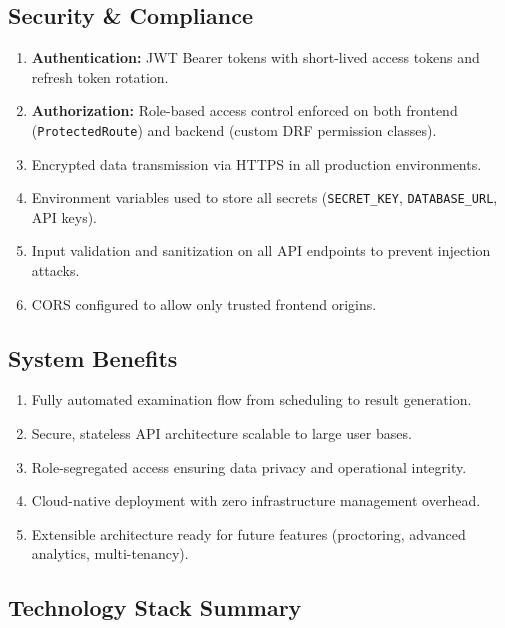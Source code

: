 \documentclass[12pt,a4paper]{article}
\begin{document}
\subsection{Security \& Compliance}

\begin{enumerate}[leftmargin=1.5em]
  \item \textbf{Authentication:} JWT Bearer tokens with short-lived access tokens and refresh token rotation.
  \item \textbf{Authorization:} Role-based access control enforced on both frontend (\texttt{ProtectedRoute}) and backend (custom DRF permission classes).
  \item Encrypted data transmission via HTTPS in all production environments.
  \item Environment variables used to store all secrets (\texttt{SECRET\_KEY}, \texttt{DATABASE\_URL}, API keys).
  \item Input validation and sanitization on all API endpoints to prevent injection attacks.
  \item CORS configured to allow only trusted frontend origins.
\end{enumerate}

\subsection{System Benefits}

\begin{enumerate}[leftmargin=1.5em]
  \item Fully automated examination flow from scheduling to result generation.
  \item Secure, stateless API architecture scalable to large user bases.
  \item Role-segregated access ensuring data privacy and operational integrity.
  \item Cloud-native deployment with zero infrastructure management overhead.
  \item Extensible architecture ready for future features (proctoring, advanced analytics, multi-tenancy).
\end{enumerate}

\subsection{Technology Stack Summary}
\end{document}

